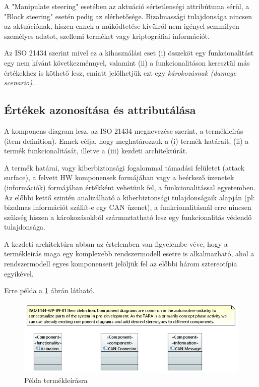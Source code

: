 A "Manipulate steering" esetében az aktuáció sértetlenségi attribútuma sérül, a "Block steering" esetén pedig az elérhetősége. Bizalmassági tulajdonsága nincsen az aktuációnak, hiszen ennek a működtetése kívülről nem igényel semmilyen személyes adatot, szellemi terméket vagy kriptográfiai információt.

Az ISO 21434 szerint mivel ez a kihasználási eset (i) összeköt egy funkcionalitást egy nem kívánt következménnyel, valamint (ii) a funkcionalitáson keresztül más értékekhez is köthető lesz, emiatt jelölhetjük ezt egy \textit{károkozásnak (damage scenario)}.

\subsection{Értékek azonosítása és attributálása}

A komponens diagram lesz, az ISO 21434 megnevezése szerint, a termékleírás (item definition). Ennek célja, hogy meghatározzuk a (i) termék határait, (ii) a termék funkcionalitását, illetve a (iii) kezdeti architektúrát.

A termék határai, vagy kiberbiztonsági fogalommal támadási felületet (attack surface), a felvett HW komponensek formájában vagy a beérkező üzenetek (információk) formájában értékként vehetünk fel, a funkcionalitással egyetemben. Az előbbi kettő szintén analizálható a kiberbiztonsági tulajdonságaik alapján (pl: bizalmas információt szállít-e egy CAN üzenet), a funkcionalitásnál erre nincsen szükség hiszen a károkozásokból származtatható lesz egy funkcionalitás védendő tulajdonsága.

A kezdeti architektúra abban az értelemben van figyelembe véve, hogy a termékleírás maga egy komplexebb rendszermodell esetre is alkalmazható, ahol a rendszermodell egyes komponenseit jelöljük fel az előbbi három sztereotípia egyikével.

Erre példa a \ref{fig:04_item_definition} ábrán látható.

\begin{figure}[!ht]
	\centering
	\includegraphics[width=130mm, keepaspectratio]{figures/04_item_definition.PNG}
	\caption{Példa termékleírásra}
	\label{fig:04_item_definition}
\end{figure}

